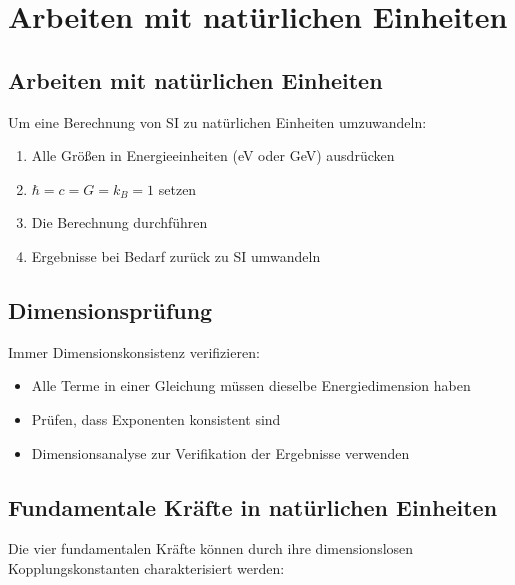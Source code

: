 	\section{Arbeiten mit natürlichen Einheiten}
	
	\subsection{Arbeiten mit natürlichen Einheiten}
	
	Um eine Berechnung von SI zu natürlichen Einheiten umzuwandeln:
	\begin{enumerate}
		\item Alle Größen in Energieeinheiten (eV oder GeV) ausdrücken
		\item $\hbar = c = G = k_B = 1$ setzen
		\item Die Berechnung durchführen
		\item Ergebnisse bei Bedarf zurück zu SI umwandeln
	\end{enumerate}
	
	\subsection{Dimensionsprüfung}
	
	Immer Dimensionskonsistenz verifizieren:
	\begin{itemize}
		\item Alle Terme in einer Gleichung müssen dieselbe Energiedimension haben
		\item Prüfen, dass Exponenten konsistent sind
		\item Dimensionsanalyse zur Verifikation der Ergebnisse verwenden
	\end{itemize}
	
	\subsection{Fundamentale Kräfte in natürlichen Einheiten}
	
	Die vier fundamentalen Kräfte können durch ihre dimensionslosen Kopplungskonstanten charakterisiert werden:
	

